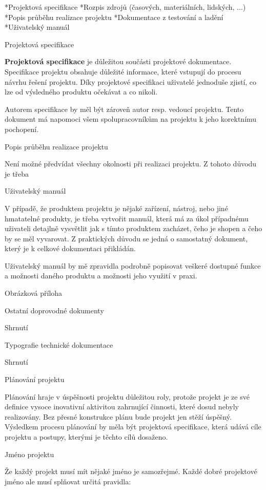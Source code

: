 \begitems
*Projektová specifikace
*Rozpis zdrojů (časových, materiálních, lidských, ...)
*Popis průběhu realizace projektu
*Dokumentace z testování a ladění
*Uživatelský manuál
\enditems

\sec Projektová specifikace

{\bf Projektová specifikace} je důležitou součásti projektové dokumentace. Specifikace projektu obsahuje důležité informace, které
vstupují do procesu návrhu řešení projektu. Díky projektové specifikaci uživatelé jednoduše zjistí, co lze od výsledného produktu očekávat a co nikoli.

Autorem specifikace by měl být zároveň autor resp. vedoucí projektu. Tento dokument má napomoci všem spolupracovníkům na projektu k jeho korektnímu pochopení. 

\sec Popis průběhu realizace projektu

Není možné předvídat všechny okolnosti při realizaci projektu. Z tohoto důvodu je třeba

\sec Uživatelský manuál

V případě, že produktem projektu je nějaké zařízení, nástroj, nebo jiné hmatatelné produkty, je třeba vytvořit manuál, která má za úkol případnému uživateli detajlně vysvětlit jak s tímto produktem zacházet, čeho je shopen a čeho by se měl vyvarovat. Z praktických důvodu se jedná o samostatný dokument, který je k celkové dokumentaci přikládán. 

Uživatelský manuál by mě zpravidla podrobně popisovat veškeré dostupné funkce a možnosti daného produktu a možnosti jeho využití v praxi. 

\sec Obrázková příloha

\sec Ostatní doprovodné dokumenty

\sec Shrnutí

\chap Typografie technické dokumentace

\sec Shrnutí

\chap Plánování projektu

Plánování hraje v úspěšnosti projektu důležitou roly, protože projekt je ze své definice vysoce inovativní aktivitou zahrnující činnosti, které dosud nebyly realizovány. Bez přesné konstrukce plánu bude projekt jen stěží úspěšný. Výsledkem procesu plánování by měla být projektová specifikace, která udává cíle projektu a postupy, kterými je těchto cílů dosaženo.



\sec Jméno projektu

Že každý projekt musí mít nějaké jméno je samozřejmé. Každé dobré projektové jméno ale musí splňovat určitá pravidla:


